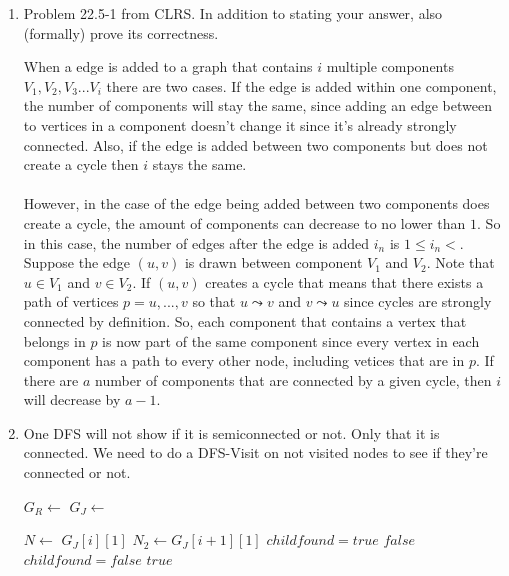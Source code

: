 \documentclass[letterpaper,11pt]{article}
\begin{document}
\begin{enumerate}
\item Problem 22.5-1 from CLRS. In addition to stating your answer, also (formally) prove its correctness.

When a edge is added to a graph that contains $i$ multiple components $V_1,V_2,V_3...V_i$ there are two cases. If the edge is added within one component, the number of components will stay the same, since adding an edge between to vertices in a component doesn't change it since it's already strongly connected. Also, if the edge is added between two components but does not create a cycle then $i$ stays the same. \\ \\ However, in the case of the edge being added between two components does create a cycle, the amount of components can decrease to no lower than $1$. So in this case, the number of edges after the edge is added $i_n$ is $1 \leq i_n <$. Suppose the edge $(u,v)$ is drawn between component $V_1$ and $V_2$. Note that $u \in V_1$ and $v \in V_2$. If $(u,v)$ creates a cycle that means that there exists a path of vertices $p = {u,...,v}$ so that $u \leadsto v$ and $v \leadsto u$ since cycles are strongly connected by definition. So, each component that contains a vertex that belongs in $p$ is now part of the same component since every vertex in each component has a path to every other node, including vetices that are in $p$.  If there are $a$ number of components that are connected by a given cycle, then $i$ will decrease by $a-1$. 
 
\item 
One DFS will not show if it is semiconnected or not. Only that it is connected. We need to do a DFS-Visit on not visited nodes to see if they're connected or not.

\begin{algorithm}
\begin{algorithmic}[1]
\State $G_R \gets$ 
\State $G_J \gets$ 

\State $N \gets$ $G_J[i][1]$
\State $N_2 \gets G_J[i+1][1]$
\State $childfound = true$
\EndIf
\EndFor
{}
\State \Return $false$
\EndIf
\State $childfound = false$
\EndFor
\State \Return $true$
\EndFunction
\end{algorithmic}
\end{algorithm}

\end{enumerate}
\end{document}
